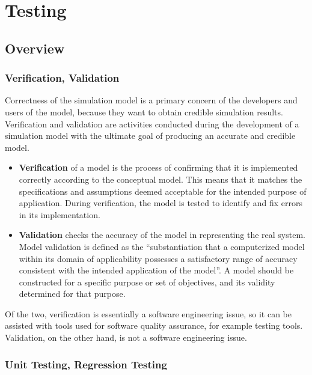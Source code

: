 \chapter{Testing}
\label{cha:testing}

\section{Overview}
\label{sec:testing:overview}

\subsection{Verification, Validation}
\label{sec:testing:verification-validation}

Correctness of the simulation model is a primary concern of the developers
and users of the model, because they want to obtain credible simulation
results. Verification and validation are activities conducted during the
development of a simulation model with the ultimate goal of producing an
accurate and credible model.

\begin{itemize}
\item \textbf{Verification} of a model is the process of confirming that it is
    implemented correctly according to the conceptual model. This means that it
    matches the specifications and assumptions deemed acceptable for the intended
    purpose of application. During verification, the model is tested to identify and
    fix errors in its implementation.
\item \textbf{Validation} checks the accuracy of the model in representing the
    real system. Model validation is defined as the ``substantiation that a
    computerized model within its domain of applicability possesses a satisfactory
    range of accuracy consistent with the intended application of the model''. A
    model should be constructed for a specific purpose or set of objectives, and its
    validity determined for that purpose.
\end{itemize}

Of the two, verification is essentially a software engineering issue, so it
can be assisted with tools used for software quality assurance, for example
testing tools. Validation, on the other hand, is not a software engineering issue.

\subsection{Unit Testing, Regression Testing}
\label{sec:testing:unit-testing-regression-testing}

